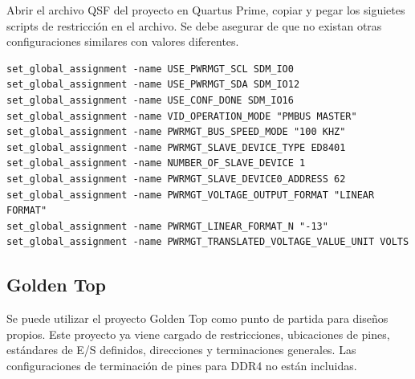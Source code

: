     Abrir el archivo QSF del proyecto en Quartus Prime, copiar y pegar los siguietes scripts de restricci\'on en el archivo. Se debe asegurar de que no existan otras configuraciones similares con valores diferentes.

    \begin{lstlisting}
set_global_assignment -name USE_PWRMGT_SCL SDM_IO0
set_global_assignment -name USE_PWRMGT_SDA SDM_IO12
set_global_assignment -name USE_CONF_DONE SDM_IO16
set_global_assignment -name VID_OPERATION_MODE "PMBUS MASTER"
set_global_assignment -name PWRMGT_BUS_SPEED_MODE "100 KHZ"
set_global_assignment -name PWRMGT_SLAVE_DEVICE_TYPE ED8401
set_global_assignment -name NUMBER_OF_SLAVE_DEVICE 1
set_global_assignment -name PWRMGT_SLAVE_DEVICE0_ADDRESS 62
set_global_assignment -name PWRMGT_VOLTAGE_OUTPUT_FORMAT "LINEAR FORMAT"
set_global_assignment -name PWRMGT_LINEAR_FORMAT_N "-13"
set_global_assignment -name PWRMGT_TRANSLATED_VOLTAGE_VALUE_UNIT VOLTS
    \end{lstlisting}

\subsection{Golden Top}

    Se puede utilizar el proyecto Golden Top como punto de partida para dise\~nos propios. Este proyecto ya viene cargado de restricciones, ubicaciones de pines, est\'andares de E/S definidos, direcciones y terminaciones generales. Las configuraciones de terminaci\'on de pines para DDR4 no est\'an incluidas.
